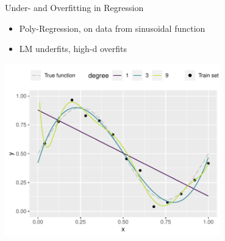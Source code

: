 \documentclass[11pt,compress,t,notes=noshow, xcolor=table]{beamer}
\begin{document}
\begin{vbframe}{Under- and Overfitting in Regression}
\begin{itemize}
\item Poly-Regression, on data from sinusoidal function
\item LM underfits, high-d overfits
\end{itemize}
\begin{center}
\includegraphics[width=0.7\textwidth]{figure/eval_train_2} 
\end{center}
\end{vbframe}
\end{document}
